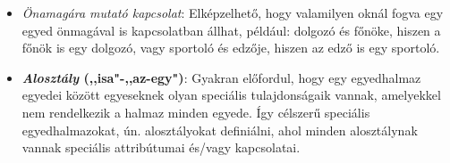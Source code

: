 \documentclass[tikz,12pt,margin=0px]{article}
\begin{document}
    \begin{itemize}
        \item \emph{Önamagára mutató kapcsolat}: Elképzelhető, hogy valamilyen oknál fogva egy egyed önmagával is kapcsolatban állhat, például: dolgozó és főnöke, hiszen a főnök is egy dolgozó, vagy sportoló és edzője, hiszen az edző is egy sportoló.
        \begin{center}
             \qquad \qquad
        \end{center}
        \item \textbf{\textit{Alosztály} (,,isa"-,,az-egy")}: Gyakran előfordul, hogy egy egyedhalmaz egyedei között egyeseknek olyan speciális tulajdonságaik vannak, amelyekkel nem rendelkezik a halmaz minden egyede. Így célszerű speciális egyedhalmazokat, ún. alosztályokat definiálni, ahol minden alosztálynak vannak speciális attribútumai és/vagy kapcsolatai. \\


\end{itemize}
\end{document}
